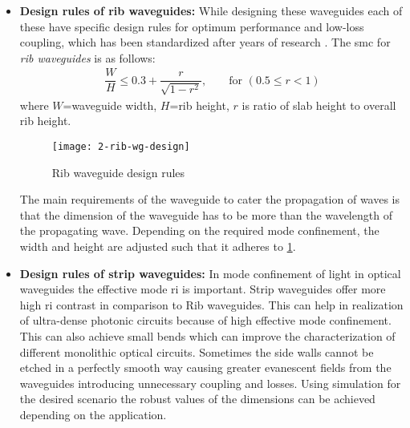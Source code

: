 \documentclass[../report.tex]{subfiles}
\begin{document}
\begin{itemize}	
	\item \textbf{Design rules of rib waveguides:} While designing these waveguides each of these have specific design rules for optimum performance and low-loss coupling, which has been standardized after years of research \cite{reed_silicon_2008}. The \gls{smc} for \textit{rib waveguides} is as follows:	
	\begin{equation}\label{eq:smc_rib_wg}
	\begin{aligned}
	\dfrac {W} {H}\leq 0.3+\dfrac {r} {\sqrt {1-r^{2}}},  && \text{ for } (0.5 \leq r < 1)
	\end{aligned}
	\end{equation}
	where $W$=waveguide width, $H$=rib height, $r$ is ratio of slab height to overall rib height.
	\begin{figure}[H] %
		\centering
		\texttt{[image: 2-rib-wg-design]}
		\caption{Rib waveguide design rules}
		\label{fig:2_rib_wg_design}
	\end{figure}
The main requirements of the waveguide to cater the propagation of waves is that the dimension of the waveguide has to be more than the wavelength of the propagating wave. Depending on the required mode confinement, the width and height are adjusted such that it adheres to \ref{fig:2_rib_wg_design}.
	
\item \textbf{Design rules of strip waveguides:} In mode confinement of light in optical waveguides the effective mode \gls{ri} is important. Strip waveguides offer more high \gls{ri} contrast in comparison to Rib waveguides. This can help in realization of ultra-dense photonic circuits because of high effective mode confinement. This can also achieve small bends which can improve the characterization of different monolithic optical circuits. Sometimes the side walls cannot be etched in a perfectly smooth way causing greater evanescent fields from the waveguides introducing unnecessary coupling and losses. Using simulation for the desired scenario the robust values of the dimensions can be achieved depending on the application.
\end{itemize}
		
\end{document}

